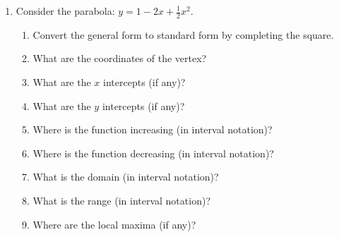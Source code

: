 \documentclass[letterpaper,12pt,fleqn]{article}
\begin{document}
\begin{enumerate}
\begin{enumerate}
    \begin{figure}[h]
      \setlength{\leftskip}{1in}
    \end{figure}
  \end{enumerate}

  \newpage

\item Consider the parabola: $y=1-2x+\frac{1}{2}x^2$.
  \begin{enumerate}
  \item Convert the general form to standard form by completing the square.

    \vspace{3in}
    
  \item What are the coordinates of the vertex?

    \vspace{1in}

  \item What are the $x$ intercepts (if any)?

    \vspace{2in}
    
  \item What are the $y$ intercepts (if any)?

    \newpage
    
  \item Where is the function increasing (in interval notation)?

    \vspace{0.5in}
    
  \item Where is the function decreasing (in interval notation)?

    \vspace{0.5in}
    
  \item What is the domain (in interval notation)?

    \vspace{0.5in}

  \item What is the range (in interval notation)?

    \vspace{0.5in}
    
  \item Where are the local maxima (if any)?


\end{enumerate}
\end{enumerate}
\end{document}

